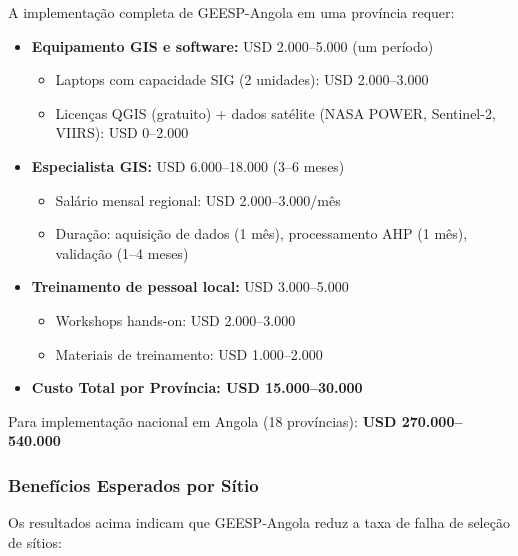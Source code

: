 \documentclass[12pt, a4paper]{article}
\begin{document}
A implementação completa de GEESP-Angola em uma província requer:

\begin{itemize}
\item \textbf{Equipamento GIS e software:} USD 2.000--5.000 (um período)
  \begin{itemize}
  \item Laptops com capacidade SIG (2 unidades): USD 2.000--3.000
  \item Licenças QGIS (gratuito) + dados satélite (NASA POWER, Sentinel-2, VIIRS): USD 0--2.000
  \end{itemize}

\item \textbf{Especialista GIS:} USD 6.000--18.000 (3--6 meses)
  \begin{itemize}
  \item Salário mensal regional: USD 2.000--3.000/mês
  \item Duração: aquisição de dados (1 mês), processamento AHP (1 mês), validação (1--4 meses)
  \end{itemize}

\item \textbf{Treinamento de pessoal local:} USD 3.000--5.000
  \begin{itemize}
  \item Workshops hands-on: USD 2.000--3.000
  \item Materiais de treinamento: USD 1.000--2.000
  \end{itemize}

\item \textbf{\textbf{Custo Total por Província: USD 15.000--30.000}}
\end{itemize}

Para implementação nacional em Angola (18 províncias): \textbf{USD 270.000--540.000}

\subsubsection{Benefícios Esperados por Sítio}

Os resultados acima indicam que GEESP-Angola reduz a taxa de falha de seleção de sítios:
\end{document}
